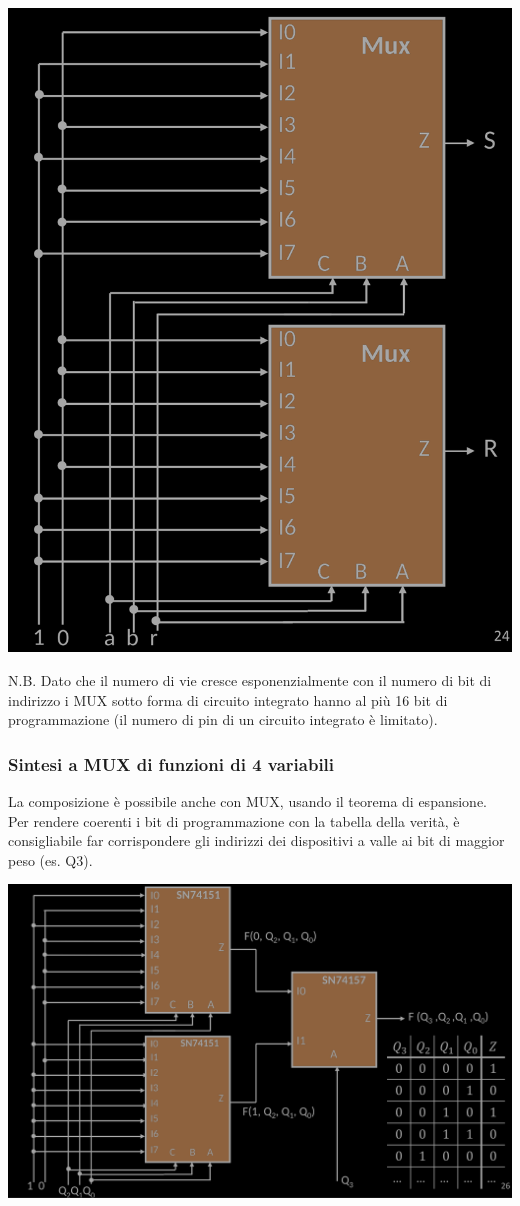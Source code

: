 \documentclass{article}
\begin{document}
\begin{center}
    \includegraphics[scale=0.37]{MUXfa.png}
\end{center}
N.B. Dato che il numero di vie cresce esponenzialmente con il numero di bit di indirizzo i MUX sotto forma di circuito integrato hanno al più 16 bit di programmazione (il numero di pin di un circuito integrato è limitato).
\subsubsection{Sintesi a MUX di funzioni di 4 variabili}
La composizione è possibile anche con MUX, usando il teorema di espansione. Per rendere coerenti i bit di programmazione con la tabella della verità, è consigliabile far corrispondere gli indirizzi dei dispositivi a valle ai bit di maggior peso (es. Q3).
\begin{center}
    \includegraphics[scale=0.37]{MUX4var.png}
\end{center}
\end{document}
